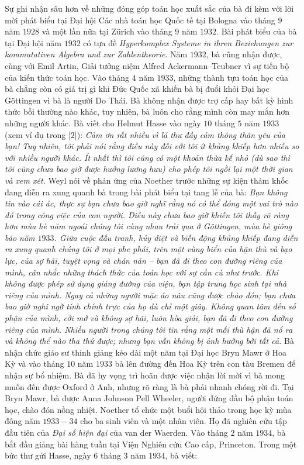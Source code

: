 \begin{multicols}{2}
	\vskip 0.05cm
	Sự ghi nhận sâu hơn về những đóng góp toán học xuất sắc của bà đi kèm với lời mời phát biểu tại Đại hội Các nhà toán học Quốc tế  tại Bologna vào tháng $9$ năm $1928$ và một lần nữa tại Zürich vào tháng $9$ năm $1932$. Bài phát biểu của bà tại Đại hội năm $1932$ có tựa đề \textit{Hyperkomplex Systeme in ihren Beziehungen zur kommutativen Algebra und zur Zahlentheorie}. Năm $1932$, bà cũng nhận được, cùng với Emil Artin, Giải tưởng niệm Alfred Ackermann--Teubner vì sự tiến bộ của kiến thức toán học. Vào tháng $4$ năm $1933$, những thành tựu toán học của bà chẳng còn có giá trị gì khi Đức Quốc xã khiến bà bị đuổi khỏi Đại học Göttingen vì bà là người Do Thái. Bà không nhận được trợ cấp hay bất kỳ hình thức bồi thường nào khác, tuy nhiên, bà luôn cho rằng mình còn may mắn hơn những người khác. Bà viết cho Helmut Hasse vào ngày $10$ tháng $5$ năm $1933$ (xem ví dụ trong [$2$]):
	\vskip 0.05cm
	\textit{Cảm ơn rất nhiều vì lá thư đầy cảm thông thân yêu của bạn! Tuy nhiên, tôi phải nói rằng điều này đối với tôi ít khủng khiếp hơn nhiều so với nhiều người khác. Ít nhất thì tôi cũng có một khoản thừa kế nhỏ (dù sao thì tôi cũng chưa bao giờ được hưởng lương hưu) cho phép tôi ngồi lại một thời gian và xem xét.}
	\vskip 0.05cm
	Weyl nói về phản ứng của Noether trước những sự kiện thảm khốc đang diễn ra xung quanh bà trong bài phát biểu tại tang lễ của bà:
	\vskip 0.05cm
	\textit{Bạn không tin vào cái ác, thực sự bạn chưa bao giờ nghĩ rằng nó có thể đóng một vai trò nào đó trong công việc của con người. Điều này chưa bao giờ khiến tôi thấy rõ ràng hơn mùa hè năm ngoái chúng tôi cùng nhau trải qua ở Göttingen, mùa hè giông bão năm $1933$. Giữa cuộc đấu tranh, hủy diệt và biến động khủng khiếp đang diễn ra xung quanh chúng tôi ở mọi phe phái, trên một vùng biển của hận thù và bạo lực, của sợ hãi, tuyệt vọng và chán nản -- bạn đã đi theo con đường riêng của mình, cân nhắc những thách thức của toán học với sự cần cù như trước. Khi không được phép sử dụng giảng đường của viện, bạn tập trung học sinh tại nhà riêng của mình. Ngay cả những người mặc áo nâu cũng được chào đón; bạn chưa bao giờ nghi ngờ tính chính trực của họ dù chỉ một giây. Không quan tâm đến số phận của mình, cởi mở và không sợ hãi, luôn hòa giải, bạn đã đi theo con đường riêng của mình. Nhiều người trong chúng tôi tin rằng một mối thù hận đã nổ ra và không thể nào tha thứ được; nhưng bạn vẫn không bị ảnh hưởng bởi tất cả.}
	\vskip 0.05cm
	Bà nhận chức giáo sư thỉnh giảng kéo dài một năm tại Đại học Bryn Mawr ở Hoa Kỳ và vào tháng $10$ năm $1933$ bà lên đường đến Hoa Kỳ trên con tàu Bremen để nhận sự bổ nhiệm. Bà đã hy vọng trì hoãn được việc nhận lời mời vì bà mong muốn đến được Oxford ở Anh, nhưng rõ ràng là bà phải nhanh chóng rời đi. Tại Bryn Mawr, bà được Anna Johnson Pell Wheeler, người đứng đầu bộ phận toán học, chào đón nồng nhiệt. Noether tổ chức một buổi hội thảo trong học kỳ mùa đông năm $1933-34$ cho ba sinh viên và một nhân viên. Họ đã nghiên cứu tập đầu tiên của \textit{Đại số hiện đại} của van der Waerden. Vào tháng $2$ năm $1934$, bà bắt đầu giảng bài hàng tuần tại Viện Nghiên cứu Cao cấp, Princeton. Trong một bức thư gửi Hasse, ngày $6$ tháng $3$ năm $1934$, bà viết: 

\end{multicols}

